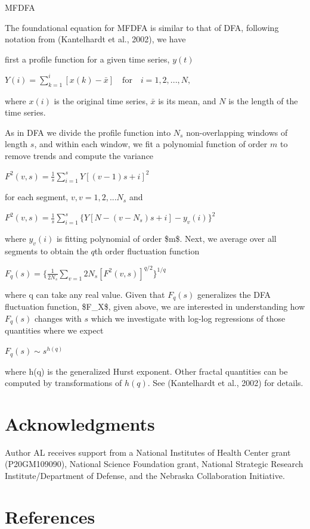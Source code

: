 \documentclass[
  man]{apa6}
\begin{document}
MFDFA

The foundational equation for MFDFA is similar to that of DFA, following
notation from (Kantelhardt et al., 2002), we
have

first a profile function for a given time series, \(y(t)\)

\(Y(i) = \sum_{k=1}^i [x(k) - \bar{x}] \quad \textrm{for} \quad i = 1, 2, ..., N,\)

where \(x(i)\) is the original time series, \(\bar{x}\) is its mean, and \(N\)
is the length of the time series.

As in DFA we divide the profile function into \(N_s\) non-overlapping
windows of length \(s\), and within each window, we fit a polynomial
function of order \(m\) to remove trends and compute the variance

\(F^2(v,s)=\frac{1}{s}\sum_{i=1}^{s}{Y[(v-1)s+i]}^2\)

for each segment, \(v, v=1,2,...N_s\) and

\(F^2(v,s)=\frac{1}{s}\sum_{i=1}^{s}\{Y[N-(v-N_s)s+i]-y_v(i)\}^2\)

where \(y_v(i)\) is fitting polynomial of order \$m\$. Next, we average
over all segments to obtain the \(q\)th order fluctuation function

\(F_q(s)=\{\frac{1}{2N_s}\sum_{v=1}{2N_s}[F^2(v,s)]^{q/2}\}^{1/q}\)

where q can take any real value. Given that \(F_q(s)\) generalizes the DFA
fluctuation function, \$F\_X\$, given above, we are interested in
understanding how \(F_q(s)\) changes with \(s\) which we investigate with
log-log regressions of those quantities where we expect

\(F_q(s)\sim s^{h(q)}\)

where h(q) is the generalized Hurst exponent. Other fractal quantities
can be computed by transformations of \(h(q)\). See
(Kantelhardt et al., 2002) for details.

\hypertarget{acknowledgments}{%
\section{Acknowledgments}\label{acknowledgments}}

Author AL receives support from a National Institutes of Health Center
grant (P20GM109090), National Science Foundation grant, National
Strategic Research Institute/Department of Defense, and the Nebraska
Collaboration Initiative.

\newpage

\hypertarget{references}{%
\section{References}\label{references}}
\end{document}
